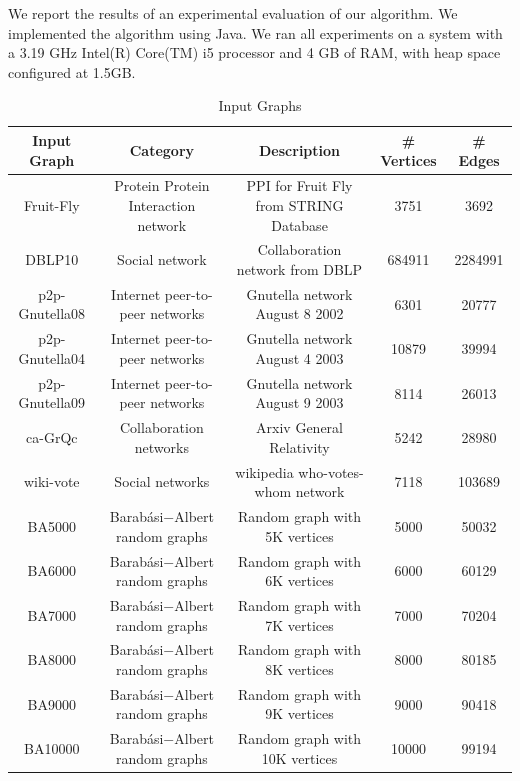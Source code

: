 \documentclass[11pt,letterpaper]{article}
\begin{document}
We report the results of an experimental evaluation of our algorithm. We implemented the algorithm using Java. We ran all experiments on a system with a 3.19 GHz Intel(R) Core(TM) i5 processor and 4 GB of RAM, with heap space configured at 1.5GB.


%
\begin{table}
\caption{Input Graphs}
\label{table:input}
\centering
\small
\begin{tabular}{c c c c c} 
\hline\hline 
Input Graph & Category & Description & \# Vertices & \# Edges \\ [0.5ex]
\hline
Fruit-Fly & Protein Protein Interaction network & PPI for Fruit Fly from STRING Database & 3751 & 3692 \\
DBLP10 & Social network & Collaboration network from DBLP & 684911 & 2284991 \\
p2p-Gnutella08 & Internet peer-to-peer networks & Gnutella network August 8 2002 & 6301 & 20777 \\
p2p-Gnutella04 & Internet peer-to-peer networks & Gnutella network August 4 2003 & 10879 & 39994 \\
p2p-Gnutella09 & Internet peer-to-peer networks & Gnutella network August 9 2003 & 8114 & 26013 \\
ca-GrQc & Collaboration networks & Arxiv General Relativity & 5242 & 28980 \\
wiki-vote & Social networks & wikipedia who-votes-whom network & 7118 & 103689 \\ 
BA5000 & Barab{\'a}si$-$Albert random graphs & Random graph with 5K vertices & 5000 & 50032 \\
BA6000 & Barab{\'a}si$-$Albert random graphs & Random graph with 6K vertices & 6000 & 60129 \\
BA7000 & Barab{\'a}si$-$Albert random graphs & Random graph with 7K vertices & 7000 & 70204 \\
BA8000 & Barab{\'a}si$-$Albert random graphs & Random graph with 8K vertices & 8000 & 80185 \\
BA9000 & Barab{\'a}si$-$Albert random graphs & Random graph with 9K vertices & 9000 & 90418 \\
BA10000 & Barab{\'a}si$-$Albert random graphs & Random graph with 10K vertices & 10000 & 99194 \\
\hline
\end{tabular}
\vspace{-0.5cm}
\end{table}
\end{document}
